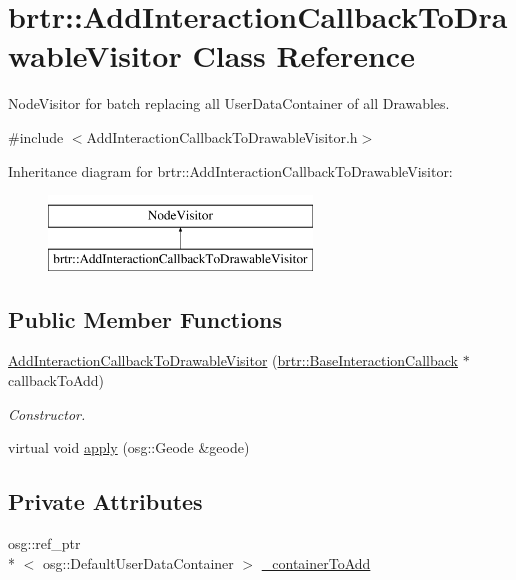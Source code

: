\hypertarget{classbrtr_1_1_add_interaction_callback_to_drawable_visitor}{\section{brtr\+:\+:Add\+Interaction\+Callback\+To\+Drawable\+Visitor Class Reference}
\label{classbrtr_1_1_add_interaction_callback_to_drawable_visitor}
}


Node\+Visitor for batch replacing all User\+Data\+Container of all Drawables.  




{\ttfamily \#include $<$Add\+Interaction\+Callback\+To\+Drawable\+Visitor.\+h$>$}

Inheritance diagram for brtr\+:\+:Add\+Interaction\+Callback\+To\+Drawable\+Visitor\+:\begin{figure}[H]
\begin{center}
\leavevmode
\includegraphics[height=2.000000cm]{classbrtr_1_1_add_interaction_callback_to_drawable_visitor}
\end{center}
\end{figure}
\subsection*{Public Member Functions}
\begin{DoxyCompactItemize}
\item 
\hyperlink{classbrtr_1_1_add_interaction_callback_to_drawable_visitor_a8c1ecd3629ec4f97d4bc2a63c56683d4}{Add\+Interaction\+Callback\+To\+Drawable\+Visitor} (\hyperlink{classbrtr_1_1_base_interaction_callback}{brtr\+::\+Base\+Interaction\+Callback} $\ast$callback\+To\+Add)
\begin{DoxyCompactList}\small\item\em Constructor. \end{DoxyCompactList}\item 
virtual void \hyperlink{classbrtr_1_1_add_interaction_callback_to_drawable_visitor_ace5d2fc7aa7c4a48f59e38728dac628a}{apply} (osg\+::\+Geode \&geode)
\end{DoxyCompactItemize}
\subsection*{Private Attributes}
\begin{DoxyCompactItemize}
\item 
osg\+::ref\+\_\+ptr\\*
$<$ osg\+::\+Default\+User\+Data\+Container $>$ \hyperlink{classbrtr_1_1_add_interaction_callback_to_drawable_visitor_ac23b4a99b1d35c2f7a32f048d4628927}{\+\_\+container\+To\+Add}
\end{DoxyCompactItemize}


